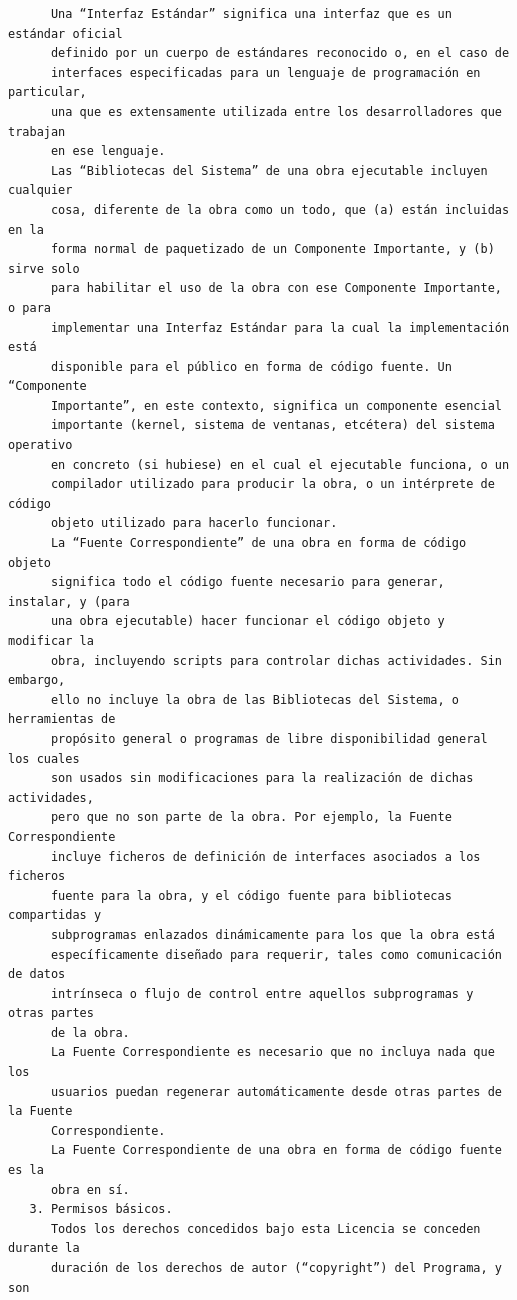 \begin{verbatim}
      Una “Interfaz Estándar” significa una interfaz que es un estándar oficial
      definido por un cuerpo de estándares reconocido o, en el caso de
      interfaces especificadas para un lenguaje de programación en particular,
      una que es extensamente utilizada entre los desarrolladores que trabajan
      en ese lenguaje.
      Las “Bibliotecas del Sistema” de una obra ejecutable incluyen cualquier
      cosa, diferente de la obra como un todo, que (a) están incluidas en la
      forma normal de paquetizado de un Componente Importante, y (b) sirve solo
      para habilitar el uso de la obra con ese Componente Importante, o para
      implementar una Interfaz Estándar para la cual la implementación está
      disponible para el público en forma de código fuente. Un “Componente
      Importante”, en este contexto, significa un componente esencial
      importante (kernel, sistema de ventanas, etcétera) del sistema operativo
      en concreto (si hubiese) en el cual el ejecutable funciona, o un
      compilador utilizado para producir la obra, o un intérprete de código
      objeto utilizado para hacerlo funcionar.
      La “Fuente Correspondiente” de una obra en forma de código objeto
      significa todo el código fuente necesario para generar, instalar, y (para
      una obra ejecutable) hacer funcionar el código objeto y modificar la
      obra, incluyendo scripts para controlar dichas actividades. Sin embargo,
      ello no incluye la obra de las Bibliotecas del Sistema, o herramientas de
      propósito general o programas de libre disponibilidad general los cuales
      son usados sin modificaciones para la realización de dichas actividades,
      pero que no son parte de la obra. Por ejemplo, la Fuente Correspondiente
      incluye ficheros de definición de interfaces asociados a los ficheros
      fuente para la obra, y el código fuente para bibliotecas compartidas y
      subprogramas enlazados dinámicamente para los que la obra está
      específicamente diseñado para requerir, tales como comunicación de datos
      intrínseca o flujo de control entre aquellos subprogramas y otras partes
      de la obra.
      La Fuente Correspondiente es necesario que no incluya nada que los
      usuarios puedan regenerar automáticamente desde otras partes de la Fuente
      Correspondiente.
      La Fuente Correspondiente de una obra en forma de código fuente es la
      obra en sí.
   3. Permisos básicos.
      Todos los derechos concedidos bajo esta Licencia se conceden durante la
      duración de los derechos de autor (“copyright”) del Programa, y son

\end{verbatim}
